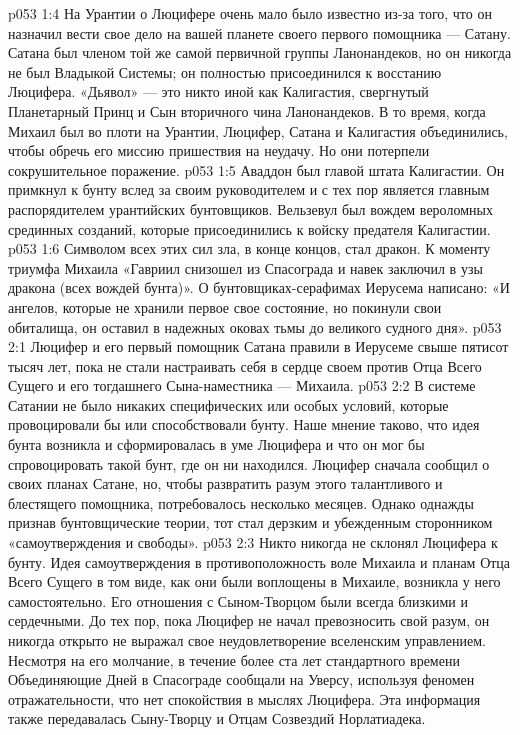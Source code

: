 \vs p053 1:4 На Урантии о Люцифере очень мало было известно из\hyp{}за того, что он назначил вести свое дело на вашей планете своего первого помощника --- Сатану. Сатана был членом той же самой первичной группы Ланонандеков, но он никогда не был Владыкой Системы; он полностью присоединился к восстанию Люцифера. «Дьявол» --- это никто иной как Калигастия, свергнутый Планетарный Принц и Сын вторичного чина Ланонандеков. В то время, когда Михаил был во плоти на Урантии, Люцифер, Сатана и Калигастия объединились, чтобы обречь его миссию пришествия на неудачу. Но они потерпели сокрушительное поражение.
\vs p053 1:5 Аваддон был главой штата Калигастии. Он примкнул к бунту вслед за своим руководителем и с тех пор является главным распорядителем урантийских бунтовщиков. Вельзевул был вождем вероломных срединных созданий, которые присоединились к войску предателя Калигастии.
\vs p053 1:6 \pc Символом всех этих сил зла, в конце концов, стал дракон. К моменту триумфа Михаила «Гавриил снизошел из Спасограда и навек заключил в узы дракона (всех вождей бунта)». О бунтовщиках\hyp{}серафимах Иерусема написано: «И ангелов, которые не хранили первое свое состояние, но покинули свои обиталища, он оставил в надежных оковах тьмы до великого судного дня».
\vs p053 2:1 Люцифер и его первый помощник Сатана правили в Иерусеме свыше пятисот тысяч лет, пока не стали настраивать себя в сердце своем против Отца Всего Сущего и его тогдашнего Сына\hyp{}наместника --- Михаила.
\vs p053 2:2 В системе Сатании не было никаких специфических или особых условий, которые провоцировали бы или способствовали бунту. Наше мнение таково, что идея бунта возникла и сформировалась в уме Люцифера и что он мог бы спровоцировать такой бунт, где он ни находился. Люцифер сначала сообщил о своих планах Сатане, но, чтобы развратить разум этого талантливого и блестящего помощника, потребовалось несколько месяцев. Однако однажды признав бунтовщические теории, тот стал дерзким и убежденным сторонником «самоутверждения и свободы».
\vs p053 2:3 \pc Никто никогда не склонял Люцифера к бунту. Идея самоутверждения в противоположность воле Михаила и планам Отца Всего Сущего в том виде, как они были воплощены в Михаиле, возникла у него самостоятельно. Его отношения с Сыном\hyp{}Творцом были всегда близкими и сердечными. До тех пор, пока Люцифер не начал превозносить свой разум, он никогда открыто не выражал свое неудовлетворение вселенским управлением. Несмотря на его молчание, в течение более ста лет стандартного времени Объединяющие Дней в Спасограде сообщали на Уверсу, используя феномен отражательности, что нет спокойствия в мыслях Люцифера. Эта информация также передавалась Сыну\hyp{}Творцу и Отцам Созвездий Норлатиадека.
